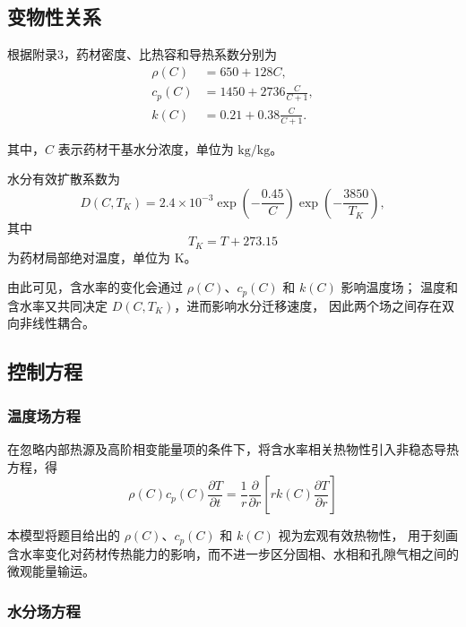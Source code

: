\documentclass[UTF8,a4paper,12pt]{ctexart}
\begin{document}
\subsection{变物性关系}

根据附录3，药材密度、比热容和导热系数分别为
\begin{align}
\rho(C) &= 650+128C,\\
c_p(C) &= 1450+2736\frac{C}{C+1},\\
k(C) &= 0.21+0.38\frac{C}{C+1}.
\end{align}

其中，$C$ 表示药材干基水分浓度，单位为 $\mathrm{kg/kg}$。

水分有效扩散系数为
\begin{equation}
D(C,T_K)
=
2.4\times10^{-3}
\exp\left(-\frac{0.45}{C}\right)
\exp\left(-\frac{3850}{T_K}\right),
\end{equation}
其中
\begin{equation}
T_K=T+273.15
\end{equation}
为药材局部绝对温度，单位为 K。

由此可见，含水率的变化会通过 $\rho(C)$、$c_p(C)$ 和 $k(C)$ 影响温度场；
温度和含水率又共同决定 $D(C,T_K)$，进而影响水分迁移速度，
因此两个场之间存在双向非线性耦合。

\subsection{控制方程}

\subsubsection{温度场方程}

在忽略内部热源及高阶相变能量项的条件下，将含水率相关热物性引入非稳态导热方程，得
\begin{equation}
\boxed{
\rho(C)c_p(C)
\frac{\partial T}{\partial t}
=
\frac{1}{r}
\frac{\partial}{\partial r}
\left[
r k(C)
\frac{\partial T}{\partial r}
\right]
}
\label{eq:heat}
\end{equation}

本模型将题目给出的 $\rho(C)$、$c_p(C)$ 和 $k(C)$ 视为宏观有效热物性，
用于刻画含水率变化对药材传热能力的影响，而不进一步区分固相、水相和孔隙气相之间的微观能量输运。

\subsubsection{水分场方程}
\end{document}
